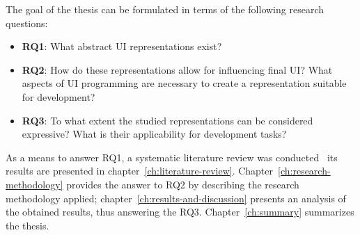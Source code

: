 
The goal of the thesis can be formulated in terms of the following research questions:
\begin{itemize}
    \item \textbf{RQ1}: What abstract UI representations exist?
    \item \textbf{RQ2}: How do these representations allow for influencing final UI? What aspects of UI programming are necessary to create a representation suitable for development?
    \item \textbf{RQ3}: To what extent the studied representations can be considered expressive? What is their applicability for development tasks?
\end{itemize}

As a means to answer RQ1, a systematic literature review was conducted \textendash\ its results are presented in chapter~\ref{ch:literature-review}.
Chapter~\ref{ch:research-methodology} provides the answer to RQ2 by describing the research methodology applied;
chapter~\ref{ch:results-and-discussion} presents an analysis of the obtained results, thus answering the RQ3.
Chapter~\ref{ch:summary} summarizes the thesis.
